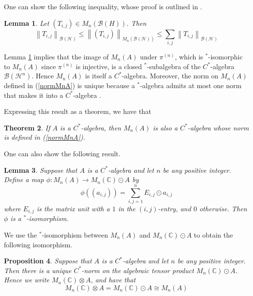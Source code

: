 \documentclass{article}
\theoremstyle{plain}
\newtheorem{theorem}{Theorem}[section]
\newtheorem{proposition}[theorem]{Proposition}
\newtheorem{lemma}[theorem]{Lemma}
\theoremstyle{definition}
\theoremstyle{remark}
\newcommand{\norm}[1]{\left\lVert#1\right\rVert}
\begin{document}
One can show 
the following inequality,
whose proof is outlined in 
\citet[Exercise 1.13]{rordam2000}.

\begin{lemma} \label{BHinequality}
	Let $(T_{i,j}) \in M_n(\mathcal{B}(H))$.
	Then
	\begin{equation}
		\norm{T_{i,j}}_{\mathcal{B}(\mathcal{H})}
		\leq
		\norm{(T_{i,j})}_{M_n(\mathcal{B}(\mathcal{H}))}
		\leq
		\sum_{i,j} \norm{T_{i,j}}_{\mathcal{B}(\mathcal{H})}
	\end{equation}
\end{lemma}

Lemma \ref{BHinequality} implies that the image of $M_n(A)$ under $\pi^{(n)}$,
which is $^*$-isomorphic to $M_n(A)$ since $\pi^{(n)}$ is injective,
is a closed $^*$-subalgebra of the $C^*$-algebra $\mathcal{B}(\mathcal{H}^n)$.
Hence $M_n(A)$ is itself a $C^*$-algebra.
Moreover, the norm on $M_n(A)$ defined in (\ref{normMnA}) is unique
because a $^*$-algebra admits at most one norm 
that makes it into a $C^*$-algebra
\citet[Corollary 1.2.8]{lin2001}.

Expressing this result as a theorem, we have that

\begin{theorem}
	If $A$ is a $C^*$-algebra, then $M_n(A)$ is also a $C^*$-algebra
	whose norm is defined in (\ref{normMnA}).
\end{theorem}

One can also show the following result.

\begin{lemma}
	Suppose that $A$ is a $C^*$-algebra and let $n$ be any positive integer.
	Define a map $\phi : M_n(A) \rightarrow M_n(\mathbb{C}) \odot A$ by
	\begin{equation} \label{phiMnCAiso}
		\phi((a_{i,j}))
		=
		\sum_{i,j = 1}^n E_{i,j} \odot a_{i,j}
	\end{equation}
	where $E_{i,j}$ is the matrix unit with a $1$ in the $(i,j)$-entry, and $0$ otherwise.
	Then $\phi$ is a $^*$-isomorphism.
\end{lemma}

We use the $^*$-isomorphism between $M_n(A)$ and $M_n(\mathbb{C}) \odot A$
to obtain the following isomorphism.

\begin{proposition}
	Suppose that $A$ is a $C^*$-algebra and let $n$ be any positive integer.
	Then there is a unique $C^*$-norm on the algebraic tensor product
	$M_n(\mathbb{C}) \odot A$.
	Hence we write $M_n(\mathbb{C}) \otimes A$, and have that
	\begin{equation}
		M_n(\mathbb{C}) \otimes A 	
		=
		M_n(\mathbb{C}) \odot A 	
		\cong
		M_n(A)
	\end{equation}
\end{proposition}
\end{document}
